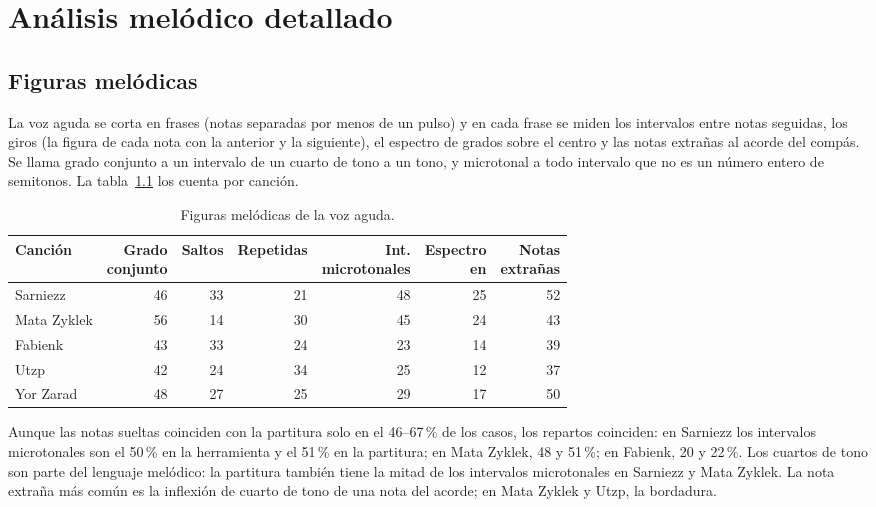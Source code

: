 \chapter{Análisis melódico detallado}\label{ap:melodico}

\section{Figuras melódicas}

La voz aguda se corta en frases (notas separadas por menos de un pulso) y en cada frase se miden los intervalos entre
notas seguidas, los giros (la figura de cada nota con la anterior y la siguiente), el espectro de grados sobre el centro y
las notas extrañas al acorde del compás. Se llama grado conjunto a un intervalo de un cuarto de tono a un tono, y
microtonal a todo intervalo que no es un número entero de semitonos. La tabla~\ref{tab:figuras} los cuenta por
canción.

\begin{table}[ht]
  \centering\small
  \caption{Figuras melódicas de la voz aguda.}\label{tab:figuras}
  \begin{tabular}{@{}lrrrrrr@{}}
    \toprule
    Canción & \shortstack{Grado\\conjunto} & Saltos & Repetidas & \shortstack{Int.\\microtonales} & \shortstack{Espectro\\en \cuarto{}} & \shortstack{Notas\\extrañas} \\
    \midrule
    Sarniezz & 46 & 33 & 21 & 48 & 25 & 52 \\
    Mata Zyklek & 56 & 14 & 30 & 45 & 24 & 43 \\
    Fabienk & 43 & 33 & 24 & 23 & 14 & 39 \\
    Utzp & 42 & 24 & 34 & 25 & 12 & 37 \\
    Yor Zarad & 48 & 27 & 25 & 29 & 17 & 50 \\
    \bottomrule
  \end{tabular}
\end{table}

Aunque las notas sueltas coinciden con la partitura solo en el 46--67\,\% de los casos, los repartos coinciden: en
Sarniezz los intervalos microtonales son el 50\,\% en la herramienta y el 51\,\% en la partitura; en Mata Zyklek, 48 y
51\,\%; en Fabienk, 20 y 22\,\%. Los cuartos de tono son parte del lenguaje melódico: la partitura también tiene la mitad
de los intervalos microtonales en Sarniezz y Mata Zyklek. La nota extraña más común es la inflexión de cuarto de tono de
una nota del acorde; en Mata Zyklek y Utzp, la bordadura.

